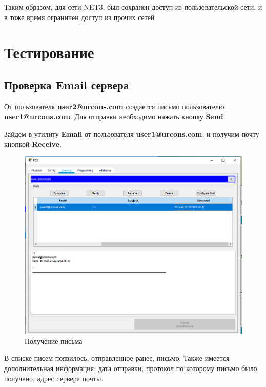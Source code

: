 \documentclass[14pt,a4paper,report]{report}
\begin{document}
Таким образом, для сети NET3, был сохранен доступ из пользовательской сети, и в тоже время ограничен доступ из прочих сетей


\section{Тестирование}
\subsection{Проверка Email сервера}
От пользователя \textbf{user2@urcons.com} создается письмо пользователю \textbf{user1@urcons.com}. Для отправки необходимо нажать кнопку \textbf{Send}.

Зайдем в утилиту \textbf{Email} от пользователя \textbf{user1@urcons.com}, и получим почту кнопкой \textbf{Receive}.
\clearpage
\begin{figure}[h]
  \centering
  \includegraphics[width=.8\textwidth]{img/1}
  \caption{Получение письма}
\end{figure}
В списке писем появилось, отправленное ранее, письмо. Также имеется дополнительная информация: дата отправки, протокол по которому письмо было получено, адрес сервера почты. 
\end{document}
